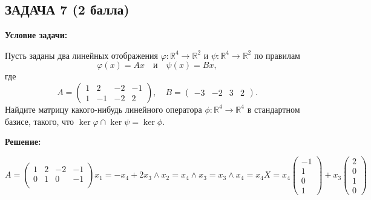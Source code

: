 \documentclass[a4paper,12pt]{article}
\begin{document}
\vspace{1cm}

\subsection{ЗАДАЧА 7 \hfill \textbf{(2 балла)}}
\textbf{Условие задачи:}

Пусть заданы два линейных отображения \( \varphi: \mathbb{R}^4 \to \mathbb{R}^2 \) и \( \psi: \mathbb{R}^4 \to \mathbb{R}^2 \) по правилам
\[
\varphi(x) = Ax \quad \text{и} \quad \psi(x) = Bx,
\]
где
\[
A =
\begin{pmatrix}
1 & 2 & -2 & -1 \\
1 & -1 & -2 & 2
\end{pmatrix},
\quad
B =
\begin{pmatrix}
-3 & -2 & 3 & 2
\end{pmatrix}.
\]
Найдите матрицу какого-нибудь линейного оператора \( \phi: \mathbb{R}^4 \to \mathbb{R}^4 \) в стандартном базисе, такого, что \( \ker \varphi \cap \ker \psi = \ker \phi \).

\textbf{Решение:}

\[
A = \begin{pmatrix}
    1 & 2 & -2 & -1 \\
    0 & 1 & 0 & -1 \\
\end{pmatrix}
x_1 = -x_4 + 2x_3  \land x_2 = x_4 \land x_3 = x_3 \land x_4 = x_4
X = x_4\begin{pmatrix}
    -1 \\ 1 \\ 0 \\1
\end{pmatrix} + x_3 \begin{pmatrix}
    2 \\ 0 \\ 1 \\ 0
\end{pmatrix}
\]
\end{document}
